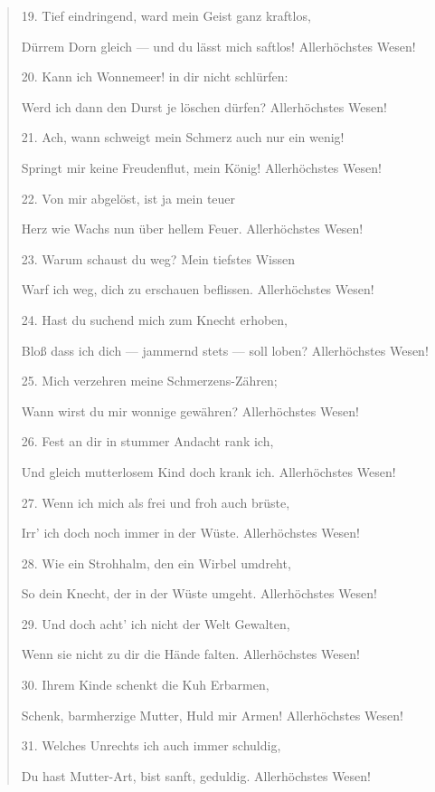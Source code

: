 \documentclass{article}
\begin{document}
\begin{quotation}\small
19. Tief eindringend, ward mein Geist ganz kraftlos,

Dürrem Dorn gleich — und du lässt mich saftlos! Allerhöchstes Wesen!

\bigskip

20. Kann ich Wonnemeer! in dir nicht schlürfen:

Werd ich dann den Durst je löschen dürfen? Allerhöchstes Wesen!

\bigskip

21. Ach, wann schweigt mein Schmerz auch nur ein wenig!

Springt mir keine Freudenflut, mein König! Allerhöchstes Wesen!

\bigskip

22. Von mir abgelöst, ist ja mein teuer

Herz wie Wachs nun über hellem Feuer. Allerhöchstes Wesen!

\bigskip

23. Warum schaust du weg? Mein tiefstes Wissen

Warf ich weg, dich zu erschauen beflissen. Allerhöchstes Wesen!

\bigskip

24. Hast du suchend mich zum Knecht erhoben,

Bloß dass ich dich — jammernd stets — soll loben? Allerhöchstes Wesen!

\bigskip

25. Mich verzehren meine Schmerzens-Zähren;

Wann wirst du mir wonnige gewähren? Allerhöchstes Wesen!

\bigskip

26. Fest an dir in stummer Andacht rank ich,

Und gleich mutterlosem Kind doch krank ich. Allerhöchstes Wesen!

\bigskip

27. Wenn ich mich als frei und froh auch brüste,

Irr' ich doch noch immer in der Wüste. Allerhöchstes Wesen!

\bigskip

28. Wie ein Strohhalm, den ein Wirbel umdreht,

So dein Knecht, der in der Wüste umgeht. Allerhöchstes Wesen!

\bigskip

29. Und doch acht' ich nicht der Welt Gewalten,

Wenn sie nicht zu dir die Hände falten. Allerhöchstes Wesen!

\bigskip

30. Ihrem Kinde schenkt die Kuh Erbarmen,

Schenk, barmherzige Mutter, Huld mir Armen! Allerhöchstes Wesen!

\bigskip

31. Welches Unrechts ich auch immer schuldig,

Du hast Mutter-Art, bist sanft, geduldig. Allerhöchstes Wesen!
\end{quotation}
\end{document}
